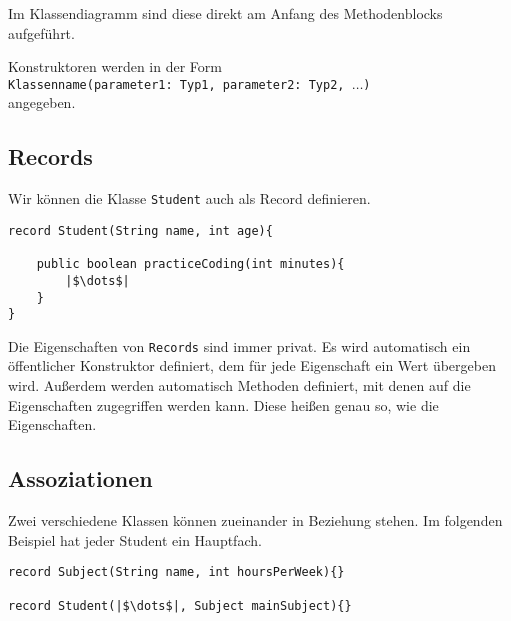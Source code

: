 \documentclass[a4paper]{scrartcl}
\begin{document}
Im Klassendiagramm sind diese direkt am Anfang des Methodenblocks aufgeführt.

\begin{center}
\end{center}

Konstruktoren werden in der Form \\ \texttt{Klassenname(parameter1: Typ1, parameter2: Typ2, $\dots$)}\\ angegeben.


\subsection*{Records}
Wir können die Klasse \texttt{Student} auch als Record definieren.
\begin{verbatim}
record Student(String name, int age){
	   
    public boolean practiceCoding(int minutes){
	    |$\dots$|
    }
}
\end{verbatim}

Die Eigenschaften von \texttt{Records} sind immer privat. Es wird automatisch ein öffentlicher Konstruktor definiert, dem für jede Eigenschaft ein Wert übergeben wird.
Außerdem werden automatisch Methoden definiert, mit denen auf die Eigenschaften zugegriffen werden kann. Diese heißen genau so, wie die Eigenschaften.
\begin{center}
\end{center}

\subsection*{Assoziationen}
Zwei verschiedene Klassen können zueinander in Beziehung stehen.
Im folgenden Beispiel hat jeder Student ein Hauptfach.
\begin{verbatim}
record Subject(String name, int hoursPerWeek){}

record Student(|$\dots$|, Subject mainSubject){}
\end{verbatim}
\end{document}
